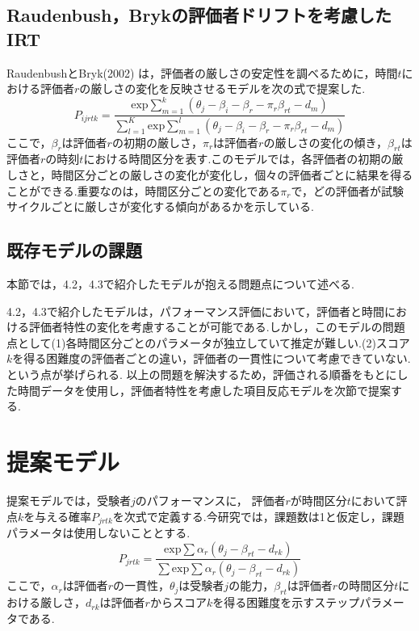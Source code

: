\documentclass[a4paper，11pt，oneside，openany]{jsbook}
\begin{document}
\section{Raudenbush，Brykの評価者ドリフトを考慮したIRT}
RaudenbushとBryk(2002) は，評価者の厳しさの安定性を調べるために，時間$t$における評価者$r$の厳しさの変化を反映させるモデルを次の式で提案した\cite{raterdrift}.
\begin{displaymath}
P_{ijrtk}=\frac{\mathrm{exp}\sum_{m=1}^{k}(\theta_{j}-\beta_{i}-\beta_{r} - \pi_{r}\beta_{rt}-d_{m})}{\sum_{l=1}^{K}\mathrm{exp}\sum_{m=1}^{l}(\theta_{j}-\beta_{i}-\beta_{r} - \pi_{r}\beta_{rt}-d_{m})}
\end{displaymath}
ここで，$\beta_{r}$は評価者$r$の初期の厳しさ，$\pi_{r}$は評価者$r$の厳しさの変化の傾き，$\beta_{rt}$は評価者$r$の時刻$t$における時間区分を表す.このモデルでは，各評価者の初期の厳しさと，時間区分ごとの厳しさの変化が変化し，個々の評価者ごとに結果を得ることができる.重要なのは，時間区分ごとの変化である$\pi_{r}$で，どの評価者が試験サイクルごとに厳しさが変化する傾向があるかを示している.

\section{既存モデルの課題}
本節では，4.2，4.3で紹介したモデルが抱える問題点について述べる.

4.2，4.3で紹介したモデルは，パフォーマンス評価において，評価者と時間における評価者特性の変化を考慮することが可能である.しかし，このモデルの問題点として(1)各時間区分ごとのパラメータが独立していて推定が難しい.(2)スコア$k$を得る困難度の評価者ごとの違い，評価者の一貫性について考慮できていない.という点が挙げられる.
以上の問題を解決するため，評価される順番をもとにした時間データを使用し，評価者特性を考慮した項目反応モデルを次節で提案する.
\newpage
\chapter{提案モデル}
提案モデルでは，受験者$j$のパフォーマンスに， 評価者$r$が時間区分$t$において評点$k$を与える確率$P_{jrtk}$を次式で定義する.今研究では，課題数は1と仮定し，課題パラメータは使用しないこととする.
\begin{displaymath}
P_{jrtk}=\frac{\mathrm{exp}\sum{\alpha_r(\theta_{j}-\beta_{rt}-d_{rk})}}{\sum \mathrm{exp}\sum{\alpha_r(\theta_{j}-\beta_{rt}-d_{rk})}}
\end{displaymath}
ここで，$\alpha_{r}$は評価者$r$の一貫性，$\theta_{j}$は受験者$j$の能力，$\beta_{rt}は$評価者$r$の時間区分$t$における厳しさ，$d_{rk}$は評価者$r$からスコア$k$を得る困難度を示すステップパラメータである.
\end{document}

